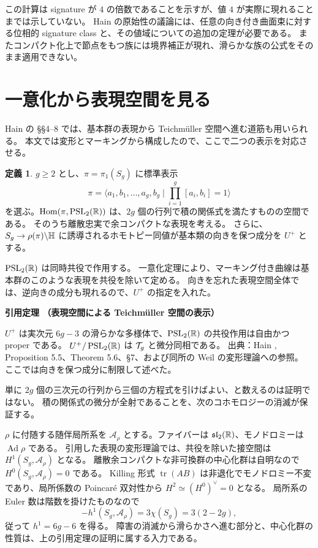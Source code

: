 \documentclass[dvipdfmx,a4paper,11pt]{article}
\theoremstyle{definition}
\newtheorem{dfn}[thm]{定義}
\DeclareMathOperator{\tr}{tr}
\newenvironment{external}[1]{\Needspace{7\baselineskip}\refstepcounter{thm}\begin{tcolorbox}[mybox,colback=blue!2,colframe=blue!40!black]\textbf{引用定理 \thethm（#1）}\par}{\end{tcolorbox}}
\begin{document}
この計算は signature が $4$ の倍数であることを示すが、値 $4$ が実際に現れることまでは示していない。
Hain の原始性の議論には、任意の向き付き曲面束に対する位相的 signature class と、その値域についての追加の定理が必要である。
またコンパクト化上で節点をもつ族には境界補正が現れ、滑らかな族の公式をそのまま適用できない。

\appendix
\clearpage
\section{一意化から表現空間を見る}
Hain の \S\S4--8 では、基本群の表現から Teichmüller 空間へ進む道筋も用いられる。
本文では変形とマーキングから構成したので、ここで二つの表示を対応させる。

\begin{dfn}
$g\ge2$ とし、$\pi=\pi_1(S_g)$ に標準表示
\[
\pi=\langle a_1,b_1,\ldots,a_g,b_g\mid\prod_{i=1}^g[a_i,b_i]=1\rangle
\]
を選ぶ。$\operatorname{Hom}(\pi,\operatorname{PSL}_2(\mathbb R))$ は、$2g$ 個の行列で積の関係式を満たすものの空間である。
そのうち離散忠実で余コンパクトな表現を考える。
さらに、$S_g\to\rho(\pi)\backslash\mathbb H$ に誘導されるホモトピー同値が基本類の向きを保つ成分を $U^+$ とする。
\end{dfn}
$\operatorname{PSL}_2(\mathbb R)$ は同時共役で作用する。
一意化定理により、マーキング付き曲線は基本群のこのような表現を共役を除いて定める。
向きを忘れた表現空間全体では、逆向きの成分も現れるので、$U^+$ の指定を入れた。

\begin{external}{表現空間による Teichmüller 空間の表示}
$U^+$ は実次元 $6g-3$ の滑らかな多様体で、$\operatorname{PSL}_2(\mathbb R)$ の共役作用は自由かつ proper である。
$U^+/\operatorname{PSL}_2(\mathbb R)$ は $\mathcal T_g$ と微分同相である。
出典：Hain \cite{Hain}, Proposition 5.5、Theorem 5.6、\S7、および同所の Weil の変形理論への参照。
ここでは向きを保つ成分に制限して述べた。
\end{external}
単に $2g$ 個の三次元の行列から三個の方程式を引けばよい、と数えるのは証明ではない。
積の関係式の微分が全射であることを、次のコホモロジーの消滅が保証する。

$\rho$ に付随する随伴局所系を $\mathcal A_\rho$ とする。ファイバーは $\mathfrak{sl}_2(\mathbb R)$、モノドロミーは $\operatorname{Ad}\rho$ である。
引用した表現の変形理論では、共役を除いた接空間は $H^1(S_g,\mathcal A_\rho)$ となる。
離散余コンパクトな非可換群の中心化群は自明なので $H^0(S_g,\mathcal A_\rho)=0$ である。
Killing 形式 $\tr(AB)$ は非退化でモノドロミー不変であり、局所係数の Poincaré 双対性から $H^2\simeq(H^0)^\vee=0$ となる。
局所系の Euler 数は階数を掛けたものなので
\[
-h^1(S_g,\mathcal A_\rho)=3\chi(S_g)=3(2-2g),
\]
従って $h^1=6g-6$ を得る。
障害の消滅から滑らかさへ進む部分と、中心化群の性質は、上の引用定理の証明に属する入力である。
\end{document}
